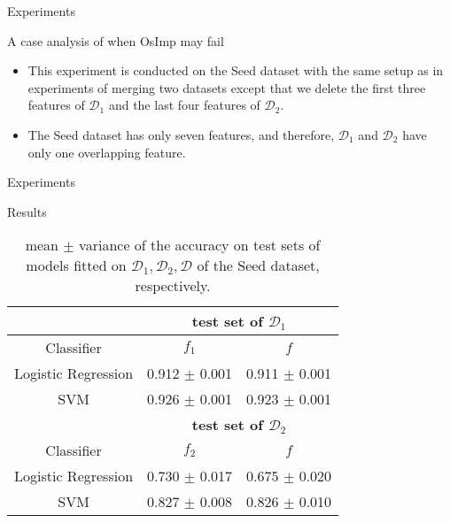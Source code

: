 \documentclass[xcolor={dvipsnames}]{beamer} %
\begin{document}
\begin{frame}{Experiments}
    \begin{block}{A case analysis of when OsImp may fail}
\begin{itemize}
    \item     This experiment is conducted on the Seed dataset with the same setup as in experiments of merging two datasets except that we delete the first three features of $\mathcal{D}_1$ and the last four features of $\mathcal{D}_2$.
    
    \item The Seed dataset has only seven features, and therefore, $\mathcal{D}_1$ and $\mathcal{D}_2$ have only one overlapping feature.
\end{itemize}
    \end{block}
\end{frame}

\begin{frame}{Experiments}
    \begin{block}{Results}
        \begin{table}[htbp]
 \caption{mean $\pm$ variance of the accuracy on test sets of models fitted on $\mathcal{D}_1,\mathcal{D}_2,\mathcal{D}$ of the Seed dataset, respectively.}
\label{tab-osimp-fail}
\begin{center}
\begin{tabular}{|c|c|c|}
\hline
\multicolumn{1}{|c|}{}& \multicolumn{2}{|c|}{\bf test set of $\mathcal{D}_1$} 
\\ \hline 
\multicolumn{1}{|c|}{Classifier}& \multicolumn{1}{|c|}{\bf ${f}_1$}  &\multicolumn{1}{|c|}{\bf ${f}$}
\\ \hline 
Logistic Regression & 0.912 $\pm$ 0.001 &0.911 $\pm$ 0.001 \\\hline
SVM & 0.926 $\pm$ 0.001 & 0.923 $\pm$ 0.001\\\hline
\hline
\multicolumn{1}{|c|}{}&\multicolumn{2}{|c|}{\bf test set of $\mathcal{D}_2$}
\\ \hline 
\multicolumn{1}{|c|}{Classifier} &\multicolumn{1}{|c|}{\bf ${f}_2$} &\multicolumn{1}{|c|}{\bf ${f}$}
\\ \hline 
Logistic Regression & 0.730 $\pm$ 0.017 & 0.675 $\pm$ 0.020\\\hline
SVM & 0.827 $\pm$ 0.008 & 0.826 $\pm$ 0.010\\\hline
\end{tabular}
\end{center}
        \end{table}
    \end{block}
\end{frame}
\begin{frame}{}
\end{frame}
\end{document}
